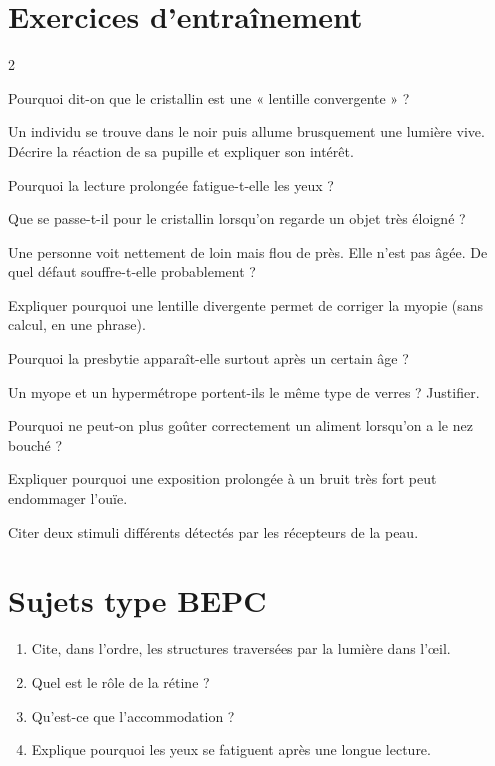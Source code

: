 \section{Exercices d'entraînement}
\begin{multicols}{2}

\exo{} Pourquoi dit-on que le cristallin est une « lentille convergente » ?

\exo{} Un individu se trouve dans le noir puis allume brusquement une lumière
vive. Décrire la réaction de sa pupille et expliquer son intérêt.

\exo{} Pourquoi la lecture prolongée fatigue-t-elle les yeux ?

\exo{} Que se passe-t-il pour le cristallin lorsqu'on regarde un objet très
éloigné ?

\exo{} Une personne voit nettement de loin mais flou de près. Elle n'est pas
âgée. De quel défaut souffre-t-elle probablement ?

\exo{} Expliquer pourquoi une lentille divergente permet de corriger la myopie
(sans calcul, en une phrase).

\exo{} Pourquoi la presbytie apparaît-elle surtout après un certain âge ?

\exo{} Un myope et un hypermétrope portent-ils le même type de verres ? Justifier.

\exo{} Pourquoi ne peut-on plus goûter correctement un aliment lorsqu'on a le nez
bouché ?

\exo{} Expliquer pourquoi une exposition prolongée à un bruit très fort peut
endommager l'ouïe.

\exo{} Citer deux stimuli différents détectés par les récepteurs de la peau.

\end{multicols}

\section{Sujets type BEPC}

\sujetbac[La vision]
\begin{enumerate}[label=\arabic*)]
\item Cite, dans l'ordre, les structures traversées par la lumière dans l'œil.
\item Quel est le rôle de la rétine ?
\item Qu'est-ce que l'accommodation ?
\item Explique pourquoi les yeux se fatiguent après une longue lecture.
\end{enumerate}

